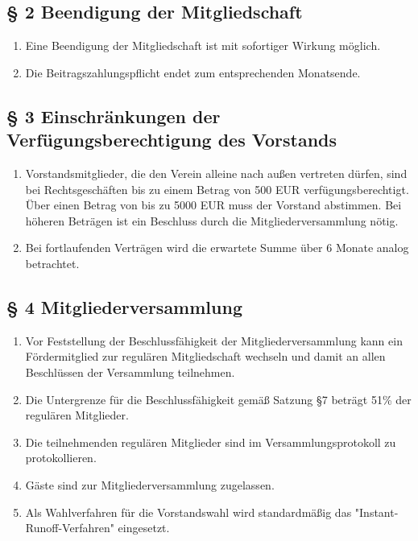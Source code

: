 \documentclass[10pt,a4paper]{article}
\begin{document}
\subsection*{§ 2 Beendigung der Mitgliedschaft}
\begin{enumerate}
\item Eine Beendigung der Mitgliedschaft ist mit sofortiger Wirkung möglich.
\item Die Beitragszahlungspflicht endet zum entsprechenden Monatsende.
\end{enumerate}
%
%
\subsection*{§ 3 Einschränkungen der Verfügungsberechtigung des Vorstands}
\begin{enumerate}
\item Vorstandsmitglieder, die den Verein alleine nach außen vertreten
    dürfen, sind bei Rechtsgeschäften bis zu einem Betrag von 500 EUR
    verfügungsberechtigt. Über einen Betrag von bis zu 5000 EUR muss der
    Vorstand abstimmen. Bei höheren Beträgen ist ein Beschluss durch die
    Mitgliederversammlung nötig.
\item Bei fortlaufenden Verträgen wird die erwartete Summe
    über 6 Monate analog betrachtet.
\end{enumerate}
%
%
\subsection*{§ 4 Mitgliederversammlung}
\begin{enumerate}
\item Vor Feststellung der Beschlussfähigkeit der Mitgliederversammlung kann ein Fördermitglied zur regulären Mitgliedschaft wechseln und damit an allen Beschlüssen der Versammlung teilnehmen.
\item Die Untergrenze für die Beschlussfähigkeit gemäß Satzung §7 beträgt 51\% der regulären Mitglieder.
\item Die teilnehmenden regulären Mitglieder sind im Versammlungsprotokoll zu protokollieren.
\item Gäste sind zur Mitgliederversammlung zugelassen.
\item Als Wahlverfahren für die Vorstandswahl wird standardmäßig das "Instant-Runoff-Verfahren" eingesetzt.
\end{enumerate}
%
%
\end{document}
